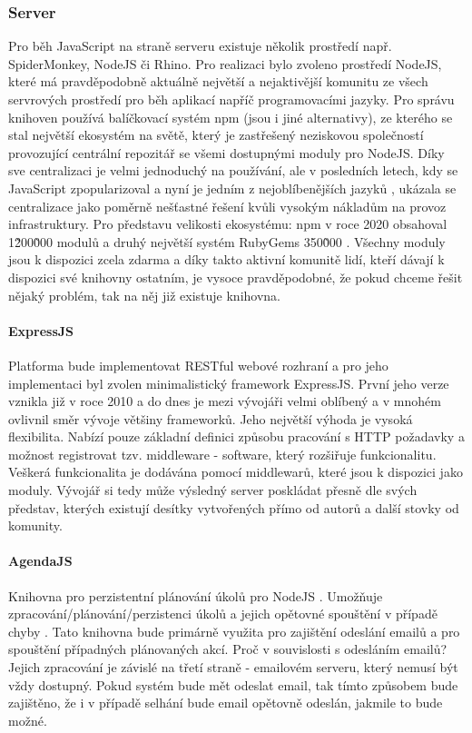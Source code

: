 \subsubsection{Server}    %
Pro běh JavaScript na straně serveru existuje několik prostředí např. SpiderMonkey, NodeJS či Rhino. Pro realizaci bylo zvoleno prostředí NodeJS, které má pravděpodobně aktuálně největší a nejaktivější komunitu ze všech servrových prostředí pro běh aplikací napříč programovacími jazyky. Pro správu knihoven používá balíčkovací systém npm (jsou i jiné alternativy), ze kterého se stal největší ekosystém na světě, který je zastřešený neziskovou společností  provozující centrální repozitář se všemi dostupnými moduly pro NodeJS. Díky sve centralizaci je velmi jednoduchý na používání, ale v posledních letech, kdy se JavaScript zpopularizoval a nyní je jedním z nejoblíbenějších jazyků \cite{survey-languages}, ukázala se centralizace jako poměrně nešťastné řešení kvůli vysokým nákladům na provoz infrastruktury. Pro představu velikosti ekosystému: npm v roce 2020 obsahoval 1\~200\~000 modulů a druhý největší systém RubyGems  350\~000 \cite{modulecounts}. Všechny moduly jsou k dispozici zcela zdarma a díky takto aktivní komunitě lidí, kteří dávají k dispozici své knihovny ostatním, je vysoce pravděpodobné, že pokud chceme řešit nějaký problém, tak na něj již existuje knihovna.

\paragraph{ExpressJS}\label{expressjs} Platforma bude implementovat RESTful webové rozhraní a pro jeho implementaci byl zvolen minimalistický framework ExpressJS. První jeho verze vznikla již v roce 2010 a do dnes je mezi vývojáři velmi oblíbený a v mnohém ovlivnil směr vývoje většiny frameworků. Jeho největší výhoda je vysoká flexibilita. Nabízí pouze základní definici způsobu pracování s HTTP požadavky a možnost registrovat tzv. middleware - software, který rozšiřuje funkcionalitu. Veškerá funkcionalita je dodávána pomocí middlewarů, které jsou k dispozici jako moduly. Vývojář si tedy může výsledný server poskládat přesně dle svých představ, kterých existují desítky vytvořených přímo od autorů a další stovky od komunity. \cite{expressjs}


\paragraph{AgendaJS} Knihovna pro perzistentní plánování úkolů pro NodeJS \cite{agendajs}. Umožňuje zpracování/plánování/perzistenci úkolů a jejich opětovné spouštění v případě chyby \cite{agendajs}. Tato knihovna bude primárně využita pro zajištění odeslání emailů a pro spouštění případných plánovaných akcí. Proč v souvislosti s odesláním emailů? Jejich zpracování je závislé na třetí straně - emailovém serveru, který nemusí být vždy dostupný. Pokud systém bude mět odeslat email, tak tímto způsobem bude zajištěno, že i v případě selhání bude email opětovně odeslán, jakmile to bude možné.

